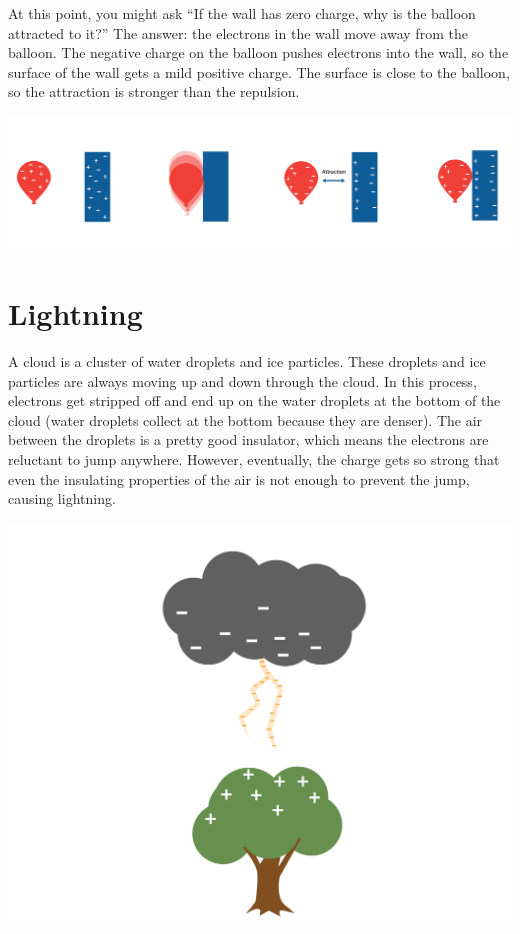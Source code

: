 At this point, you might ask ``If the wall has zero
charge, why is the balloon attracted to it?'' The answer: the
electrons in the wall move away from the balloon. The negative charge
on the balloon pushes electrons into the wall, so the surface of the
wall gets a mild positive charge. The surface is close to the balloon,
so the attraction is stronger than the repulsion.

\includegraphics[width=1\textwidth]{balloon2.png}

\section{Lightning}

A cloud is a cluster of water droplets and ice particles. These
droplets and ice particles are always moving up and down through the
cloud. In this process, electrons get stripped off and end up on the
water droplets at the bottom of the cloud (water droplets collect at the bottom because they are denser). The air between the
droplets is a pretty good insulator, which means the electrons are reluctant
to jump anywhere. However, eventually, the charge gets so strong that
even the insulating properties of the air is not enough to prevent
the jump, causing lightning.

\includegraphics[width=1\textwidth]{lightning.png}

